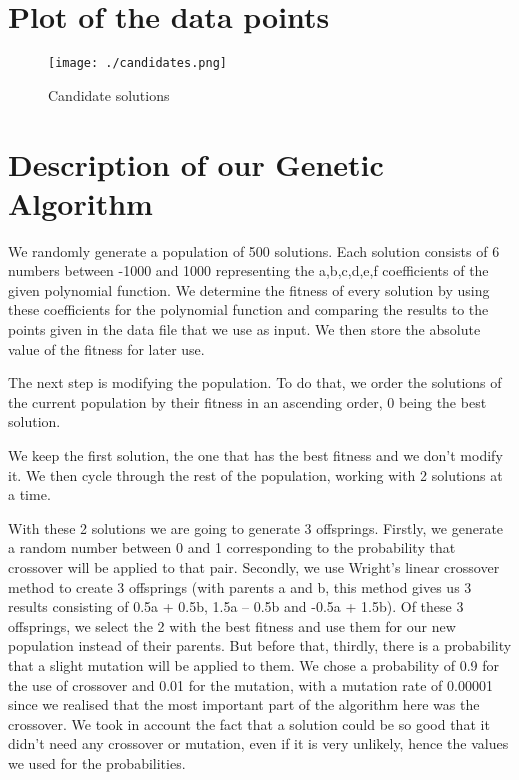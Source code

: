 \documentclass[12pt]{article}
\begin{document}
\section{Plot of the data points}

\begin{figure}[H]
	\centering
	\texttt{[image: ./candidates.png]}
	\caption{Candidate solutions}
\end{figure}

\section{Description of our Genetic Algorithm}

We randomly generate a population of 500 solutions. Each solution consists of 6 numbers between -1000 and 1000 representing the a,b,c,d,e,f coefficients of the given polynomial function. We determine the fitness of every solution by using these coefficients for the polynomial function and comparing the results to the points given in the data file that we use as input. We then store the absolute value of the fitness for later use.

The next step is modifying the population. To do that, we order the solutions of the current population by their fitness in an ascending order, 0 being the best solution.

We keep the first solution, the one that has the best fitness and we don’t modify it. We then cycle through the rest of the population, working with 2 solutions at a time.

With these 2 solutions we are going to generate 3 offsprings. Firstly, we generate a random number between 0 and 1 corresponding to the probability that crossover will be applied to that pair. Secondly, we use Wright’s linear crossover method to create 3 offsprings (with parents a and b, this method gives us 3 results consisting of 0.5a + 0.5b, 1.5a – 0.5b and -0.5a + 1.5b). Of these 3 offsprings, we select the 2 with the best fitness and use them for our new population instead of their parents. But before that, thirdly, there is a probability that a slight mutation will be applied to them. We chose a probability of 0.9 for the use of crossover and 0.01 for the mutation, with a mutation rate of 0.00001 since we realised that the most important part of the algorithm here was the crossover. We took in account the fact that a solution could be so good that it didn’t need any crossover or mutation, even if it is very unlikely, hence the values we used for the probabilities.
\end{document}
